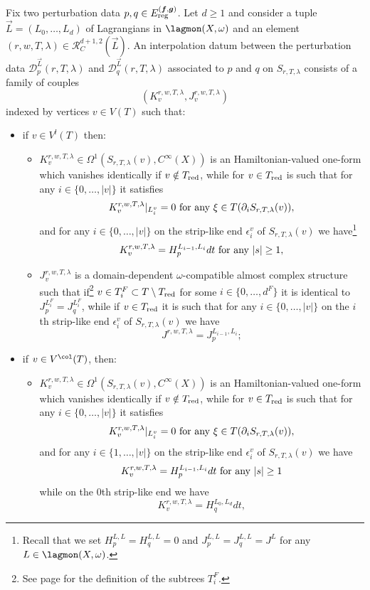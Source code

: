 	\begin{dfn}
		Fix two perturbation data $p,q\in E^{(\boldsymbol{f},\boldsymbol{g})}_\textnormal{reg}$. Let $d\geq 1$ and consider a tuple $\vec{L}=(L_0,\ldots, L_d)$ of Lagrangians in $\lagmon(X,\omega)$ and an element $(r,w,T,\lambda)\in \mathcal{R}^{d+1,2}_C(\vec{L})$. An interpolation datum between the perturbation data $\mathcal{D}^{\vec{L}}_p(r,T,\lambda)$ and $\mathcal{D}^{\vec{L}}_q(r,T,\lambda)$ associated to $p$ and $q$ on $S_{r,T,\lambda}$ consists of a family of couples $$\left(K^{r,w,T,\lambda}_v, J^{r,w,T,\lambda}_v\right)$$ indexed by vertices $v\in V(T)$ such that:
		\begin{itemize}
			\item if $v\in V^l(T)$ then:
			\begin{itemize}
				\item $K^{r,w,T,\lambda}_v\in \Omega^1(S_{r,T,\lambda}(v),C^\infty(X))$ is an Hamiltonian-valued one-form which vanishes identically if $v\notin T_\textnormal{red}$, while for $v\in T_\textnormal{red}$ is such that for any $i\in\{0,\ldots, |v|\}$ it satisfies $$K^{r,w,T,\lambda}_v|_{L^v_i} = 0 \textnormal{   for any   }\xi\in T(\partial_iS_{r,T,\lambda}(v)),$$ and for any $i\in\{0,\ldots, |v|\}$ on the strip-like end $\epsilon^v_i$ of $S_{r,T,\lambda}(v)$ we have\footnote{Recall that we set $H_p^{L,L}=H_q^{L,L}=0$ and $J^{L,L}_p=J^{L,L}_q=J^L$ for any $L\in \lagmon(X,\omega)$.} $$K^{r,w,T,\lambda}_v=H^{L_{i-1},L_{i}}_pdt \textnormal{   for any   }|s|\geq 1,$$
				\item $J^{r,w,T,\lambda}_v$ is a domain-dependent $\omega$-compatible almost complex structure such that if\footnote{See page \pageref{fundamentaldecomposition} for the definition of the subtrees $T_i^F$.} $v\in T_i^F\subset T\setminus T_\textnormal{red}$ for some $i\in\{0,\ldots, d^F\}$ it is identical to $J^{L_i^F}_p=J^{L_i^F}_q$, while if $v\in T_\textnormal{red}$ it is such that for any $i\in\{0,\ldots, |v|\}$ on the $i$th strip-like end $\epsilon_i^v$ of $S_{r,T,\lambda}(v)$ we have $$J^{r,w,T,\lambda}=J^{L_{i-1},L_{i}}_p;$$
			\end{itemize}
			\item if $v\in V^\col(T)$, then:
			\begin{itemize}
				\item $K^{r,w,T,\lambda}_v\in \Omega^1(S_{r,T,\lambda}(v),C^\infty(X))$ is an Hamiltonian-valued one-form which vanishes identically if $v\notin T_\textnormal{red}$, while for $v\in T_\textnormal{red}$ is such that for any $i\in\{0,\ldots, |v|\}$ it satisfies $$K^{r,w,T,\lambda}_v|_{L^v_i} = 0 \textnormal{   for any   }\xi\in T(\partial_iS_{r,T,\lambda}(v)),$$ and for any $i\in\{1,\ldots, |v|\}$ on the strip-like end $\epsilon^v_i$ of $S_{r,T,\lambda}(v)$ we have $$K^{r,w,T,\lambda}_v=H^{L_{i-1},L_{i}}_pdt \textnormal{   for any   }|s|\geq 1$$ while on the $0$th strip-like end we have $$K^{r,w,T,\lambda}_v=H^{L_0,L_d}_qdt,$$

\end{itemize}
\end{itemize}
\end{dfn}
